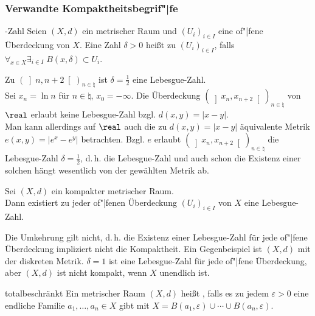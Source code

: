 \pagebreak

\subsubsection{%
    Verwandte Kompaktheitsbegrif"|fe%
}

\begin{Def}{-Zahl}
    Seien $(X, d)$ ein metrischer Raum und $(U_i)_{i \in I}$ eine of"|fene
    Überdeckung von $X$.
    Eine Zahl $\delta > 0$ heißt  zu
    $(U_i)_{i \in I}$, falls
    $\forall_{x \in X} \exists_{i \in I}\; B(x, \delta) \subset U_i$.
\end{Def}

\begin{Bsp}
    Zu $(\left]n, n + 2\right[)_{n \in \natural}$ ist $\delta = \frac{1}{2}$
    eine Lebesgue-Zahl. \\
    Sei $x_n = \ln n$ für $n \in \natural$, $x_0 = -\infty$.
    Die Überdeckung $(\left]x_n, x_{n+2}\right[)_{n \in \natural}$
    von $\real$ erlaubt keine Lebesgue-Zahl bzgl. $d(x, y) = |x - y|$. \\
    Man kann allerdings auf $\real$ auch die zu $d(x, y) = |x - y|$
    äquivalente Metrik $e(x, y) = |e^x - e^y|$ betrachten.
    Bzgl. $e$ erlaubt $(\left]x_n, x_{n+2}\right[)_{n \in \natural}$
    die Lebesgue-Zahl $\delta = \frac{1}{2}$, d.\,h. die Lebesgue-Zahl
    und auch schon die Existenz einer solchen hängt wesentlich von der
    gewählten Metrik ab.
\end{Bsp}

\begin{Lemma}{}
    Sei $(X, d)$ ein kompakter metrischer Raum. \\
    Dann existiert zu jeder of"|fenen Überdeckung $(U_i)_{i \in I}$
    von $X$ eine Lebesgue-Zahl.
\end{Lemma}

\begin{Bem}
    Die Umkehrung gilt nicht, d.\,h. die Existenz einer Lebesgue-Zahl
    für jede of"|fene Überdeckung impliziert nicht die Kompaktheit.
    Ein Gegenbeispiel ist $(X, d)$ mit der diskreten Metrik.
    $\delta = 1$ ist eine Lebesgue-Zahl für jede of"|fene Überdeckung,
    aber $(X, d)$ ist nicht kompakt, wenn $X$ unendlich ist.
\end{Bem}

\linie

\begin{Def}{totalbeschränkt}
    Ein metrischer Raum $(X, d)$ heißt , falls
    es zu jedem $\varepsilon > 0$ eine endliche Familie
    $a_1, \dotsc, a_n \in X$ gibt mit
    $X = B(a_1, \varepsilon) \cup \dotsb \cup B(a_n, \varepsilon)$.
\end{Def}

